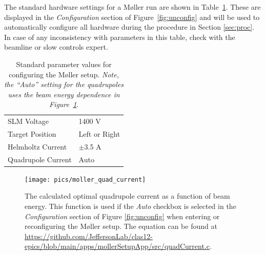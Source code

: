 \documentclass[amsmath,amssymb,notitlepage,12pt]{revtex4}
\begin{document}
The standard hardware settings for a M{\o}ller run are shown in Table~\ref{tab:pars}.  These are displayed in the {\em Configuration} section of Figure~\ref{fig:unconfig} and will be used to automatically configure all hardware during the procedure in Section \ref{sec:proc}.  In case of any inconsistency with parameters in this table, check with the beamline or slow controls expert.

\begin{table}[htbp]\centering
    \begin{tabular}{ll}\toprule[1.5pt]
        SLM Voltage & 1400 V \\
        Target Position & Left or Right \\
        Helmholtz Current & $\pm$3.5 A \\
        Quadrupole Current & Auto \\
        \bottomrule[1.5pt]
    \end{tabular}
    \caption{Standard parameter values for configuring the M{\o}ller setup. {\em  Note, the ``Auto'' setting for the quadrupoles uses the beam energy dependence in Figure~\ref{fig:quadenergy}}.\label{tab:pars}}
\end{table}

\begin{figure}[htbp]\centering
    \texttt{[image: pics/moller\_quad\_current]}
    \caption{\label{fig:quadenergy}The calculated optimal quadrupole current as a function of beam energy.  This function is used if the {\em Auto} checkbox is selected in the {\em Configuration} section of Figure \ref{fig:unconfig} when entering or reconfiguring the M{\o}ller setup.  The equation can be found at \url{https://github.com/JeffersonLab/clas12-epics/blob/main/apps/mollerSetupApp/src/quadCurrent.c}.}
\end{figure}
\end{document}
